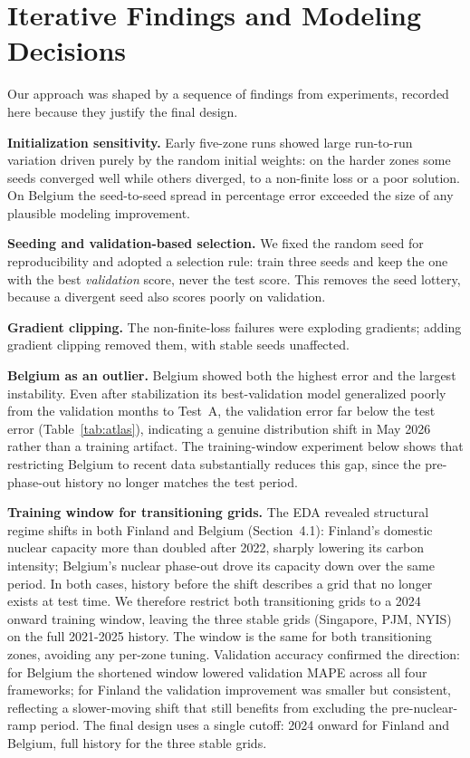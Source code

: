 \documentclass[sigconf,nonacm,a4paper]{acmart}  %
\begin{document}
\section{Iterative Findings and Modeling Decisions}
\label{sec:findings}
Our approach was shaped by a sequence of findings from experiments, recorded here
because they justify the final design.

\textbf{Initialization sensitivity.} Early five-zone runs showed large
run-to-run variation driven purely by the random initial weights: on the harder
zones some seeds converged well while others diverged, to a non-finite loss or a
poor solution. On Belgium the seed-to-seed spread in percentage error exceeded the
size of any plausible modeling improvement.

\textbf{Seeding and validation-based selection.} We fixed the random seed for
reproducibility and adopted a selection rule: train three seeds and keep the one
with the best \emph{validation} score, never the test score. This removes the seed
lottery, because a divergent seed also scores poorly on validation.

\textbf{Gradient clipping.} The non-finite-loss failures were exploding gradients;
adding gradient clipping removed them, with stable seeds unaffected.

\textbf{Belgium as an outlier.} Belgium showed both the highest error and the
largest instability. Even after stabilization its best-validation model generalized
poorly from the validation months to Test~A, the validation error far below the
test error (Table~\ref{tab:atlas}), indicating a genuine distribution shift in May
2026 rather than a training artifact. The training-window experiment below shows
that restricting Belgium to recent data substantially reduces this gap, since the
pre-phase-out history no longer matches the test period.

\textbf{Training window for transitioning grids.} The EDA revealed structural
regime shifts in both Finland and Belgium (Section~4.1): Finland's domestic
nuclear capacity more than doubled after 2022, sharply lowering its carbon
intensity; Belgium's nuclear phase-out drove its capacity down over the same
period. In both cases, history before the shift describes a grid that no longer
exists at test time. We therefore restrict both transitioning grids to a 2024
onward training window, leaving the three stable grids (Singapore, PJM, NYIS) on
the full 2021-2025 history. The window is the same for both transitioning zones,
avoiding any per-zone tuning. Validation accuracy confirmed the direction: for
Belgium the shortened window lowered validation MAPE across all four frameworks;
for Finland the validation improvement was smaller but consistent, reflecting a
slower-moving shift that still benefits from excluding the pre-nuclear-ramp period.
The final design uses a single cutoff: 2024 onward for Finland and Belgium, full
history for the three stable grids.
\end{document}
